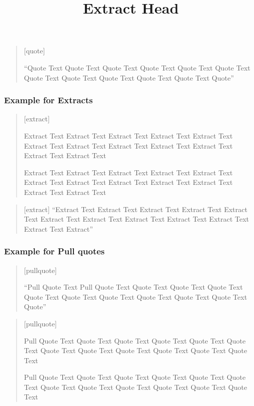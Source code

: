 \begin{quote}[quote]

``Quote Text  Quote Text  Quote Text  Quote Text Quote Text Quote Text 
Quote Text  Quote Text  Quote Text  Quote Text Quote Text Quote''

\end{quote}

\subsubsection*{Example for Extracts}

\begin{quote}[extract]
\title{Extract Head}
Extract Text  Extract Text  Extract Text  Extract Text Extract Text Extract Text 
Extract Text  Extract Text  Extract Text  Extract Text Extract Text Extract Text 

Extract Text  Extract Text  Extract Text  Extract Text Extract Text Extract Text 
Extract Text  Extract Text  Extract Text  Extract Text Extract Text Extract Text 
\end{quote}

\begin{quote}[extract]
``Extract Text  Extract Text  Extract Text  Extract Text Extract Text Extract Text 
Extract Text  Extract Text  Extract Text  Extract Text Extract Text Extract''
\end{quote}

\subsubsection*{Example for Pull quotes}

\begin{quote}[pullquote]

``Pull Quote Text  Pull Quote Text  Quote Text  Quote Text Quote Text Quote Text 
Quote Text  Quote Text  Quote Text  Quote Text Quote Text Quote''

\end{quote}

\begin{quote}[pullquote]

Pull Quote Text  Quote Text  Quote Text  Quote Text Quote Text Quote Text 
Quote Text  Quote Text  Quote Text  Quote Text Quote Text Quote Text 


Pull Quote Text  Quote Text  Quote Text  Quote Text Quote Text Quote Text 
Quote Text  Quote Text  Quote Text  Quote Text Quote Text Quote Text 

\end{quote}

